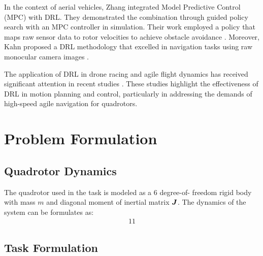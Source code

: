 \documentclass[letterpaper,journal,twoside]{IEEEtran}
\begin{document}
In the context of aerial vehicles, Zhang \etal integrated Model Predictive Control (MPC) with DRL. 
They demonstrated the combination through guided policy search 
with an MPC controller in simulation. 
Their work employed a policy that maps raw sensor data to rotor 
velocities to achieve obstacle avoidance \cite{zhang2016learning}. 
Moreover, Kahn \etal proposed a DRL methodology that excelled in 
navigation tasks using raw monocular camera images \cite{kahn2018self}.

The application of DRL in drone racing and agile flight dynamics 
has received significant attention in recent studies \cite{loquercio2019deep, song2021autonomous, song2022policy, penicka2022learning, song2023reaching}. 
These studies highlight the effectiveness of DRL in motion 
planning and control, particularly in addressing the demands of 
high-speed agile navigation for quadrotors.


\section{Problem Formulation}

\subsection{Quadrotor Dynamics}
The quadrotor used in the task is modeled as a 6 degree-of-
freedom rigid body with mass $m$ and diagonal moment of 
inertial matrix $\boldsymbol{J}$.
The dynamics of the system can be formulates as: 
\[
\begin{aligned}
  11
\end{aligned}
\]

\subsection{Task Formulation}



\end{document}
